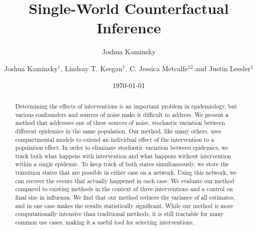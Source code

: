 \documentclass[openacc]{rsproca_new}%
\author{Joshua Kaminsky}
\date{\today}
\title{}
\begin{document}
\title{Single-World Counterfactual Inference}

\author{%
Joshua Kaminsky$^{1}$, Lindsay T. Keegan$^{1}$, C. Jessica Metcalfe$^{12}$ and Justin Lessler$^{1}$}

\address{$^{1}$Department of Epidemiology, Johns Hopkins Bloomberg School of Public Health, Baltimore, MD, USA\\
$^{2}$Department of Ecology and Evolutionary Biology, Princeton University, Princeton, NJ, USA}

\subject{Epidemiology, Infectious Disease Modeling}



\begin{abstract} %
  Determining the effects of interventions is an important problem in epidemiology, but various confounders and sources of noise make it difficult to address. %
  We present a method that addresses one of these sources of noise, stochastic variation between different epidemics in the same population. %
  Our method, like many others, uses compartmental models to extend an individual effect of the intervention to a population effect. %
  In order to eliminate stochastic variation between epidemics, we track both what happens with intervention and what happens without intervention within a single epidemic. %
  To keep track of both states simultaneously, we store the transition states that are possible in either case on a network. %
  Using this network, we can recover the events that actually happened in each case. %
  We evaluate our method compared to existing methods in the context of three interventions and a control on final size in influenza. %
  We find that our method reduces the variance of all estimates, and in one case makes the results statistically significant. %
  While our method is more computationally intensive than traditional methods, it is still tractable for many common use cases, making it a useful tool for selecting interventions. %

\end{abstract}
\end{document}
